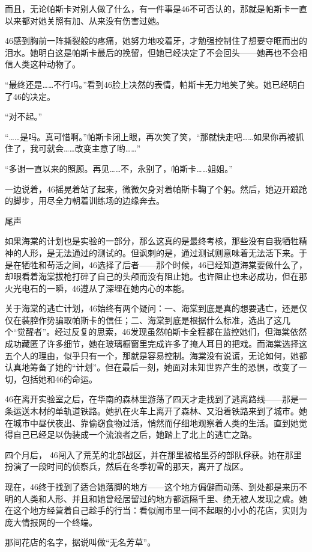 而且，无论帕斯卡对别人做了什么，有一件事是46不可否认的，那就是帕斯卡一直以来都对她关照有加、从来没有伤害过她。

46感到胸前一阵撕裂般的疼痛，她努力地咬着牙，才勉强控制住了想要夺眶而出的泪水。她明白这是帕斯卡最后的挽留，但她已经决定了不会回头——她再也不会相信人类这种动物了。

“最终还是……不行吗。”看到46脸上决然的表情，帕斯卡无力地笑了笑。她已经明白了46的决定。

“对不起。”

“……是吗。真可惜啊。”帕斯卡闭上眼，再次笑了笑，“那就快走吧……如果你再被抓住了，我可就会……改变主意了哟……”

“多谢一直以来的照顾。再见……不，永别了，帕斯卡……姐姐。”

一边说着，46摇晃着站了起来，微微欠身对着帕斯卡鞠了个躬。然后，她迈开踉跄的脚步，用尽全力朝着训练场的边缘奔去。



尾声

如果海棠的计划也是实验的一部分，那么这真的是最终考核，那些没有自我牺牲精神的人形，是无法通过的测试的。但讽刺的是，通过测试则意味着无法活下来。于是在牺牲和苟活之间，46选择了后者——那个时候，46已经知道海棠要做什么了，却眼看着海棠拔枪打碎了自己的头颅而没有阻止她。也许阻止也未必成功，但在那火光电石的一瞬，46遵从了深埋在她内心的本能。

关于海棠的逃亡计划，46始终有两个疑问：一、海棠到底是真的想要逃亡，还是仅仅在装腔作势骗取帕斯卡的信任；二、海棠到底是根据什么标准，选出了这几个“觉醒者”。经过反复的思索，46发现虽然帕斯卡全程都在监控她们，但海棠依然成功藏匿了许多细节，她在玻璃橱窗里完成许多了掩人耳目的把戏。而海棠选择这五个人的理由，似乎只有一个，那就是容易控制。海棠没有说谎，无论如何，她都认真地筹备了她的“计划”。但在最后一刻，她面对未知世界产生的恐惧，改变了一切，包括她和46的命运。

46在离开实验室之后，在华南的森林里游荡了四天才走找到了逃离路线——那是一条运送木材的单轨道铁路。她扒在火车上离开了森林、又沿着铁路来到了城市。她在城市中昼伏夜出、靠偷窃食物过活，悄然而仔细地观察着人类的生活。直到她觉得自己已经足以伪装成一个流浪者之后，她踏上了北上的逃亡之路。

四个月后， 46闯入了荒芜的北部战区，并在那里被格里芬的部队俘获。她在那里扮演了一段时间的侦察兵，然后在冬季初雪的那天，离开了战区。

现在，46终于找到了适合她落脚的地方——这个地方偏僻而动荡、到处都是来历不明的人类和人形、并且和她曾经居留过的地方都远隔千里、绝无被人发现之虞。她在这个地方经营着自己趁手的行当：看似闹市里一间不起眼的小小的花店，实则为庞大情报网的一个终端。

那间花店的名字，据说叫做“无名芳草”。



